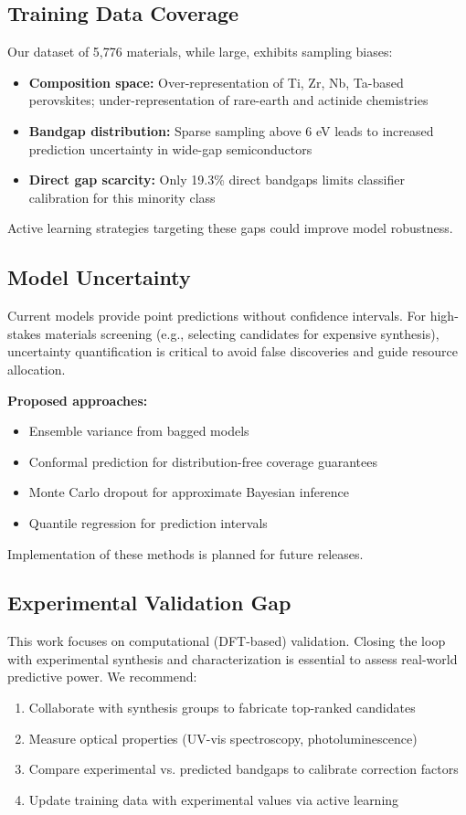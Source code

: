 \documentclass[conference]{IEEEtran}
\begin{document}
\subsection{Training Data Coverage}
Our dataset of 5,776 materials, while large, exhibits sampling biases:
\begin{itemize}
  \item \textbf{Composition space:} Over-representation of Ti, Zr, Nb, Ta-based perovskites; under-representation of rare-earth and actinide chemistries
  \item \textbf{Bandgap distribution:} Sparse sampling above 6 eV leads to increased prediction uncertainty in wide-gap semiconductors
  \item \textbf{Direct gap scarcity:} Only 19.3\% direct bandgaps limits classifier calibration for this minority class
\end{itemize}

Active learning strategies targeting these gaps could improve model robustness.

\subsection{Model Uncertainty}
Current models provide point predictions without confidence intervals. For high-stakes materials screening (e.g., selecting candidates for expensive synthesis), uncertainty quantification is critical to avoid false discoveries and guide resource allocation.

\textbf{Proposed approaches:}
\begin{itemize}
  \item Ensemble variance from bagged models
  \item Conformal prediction for distribution-free coverage guarantees
  \item Monte Carlo dropout for approximate Bayesian inference
  \item Quantile regression for prediction intervals
\end{itemize}

Implementation of these methods is planned for future releases.

\subsection{Experimental Validation Gap}
This work focuses on computational (DFT-based) validation. Closing the loop with experimental synthesis and characterization is essential to assess real-world predictive power. We recommend:
\begin{enumerate}
  \item Collaborate with synthesis groups to fabricate top-ranked candidates
  \item Measure optical properties (UV-vis spectroscopy, photoluminescence)
  \item Compare experimental vs. predicted bandgaps to calibrate correction factors
  \item Update training data with experimental values via active learning
\end{enumerate}
\end{document}
